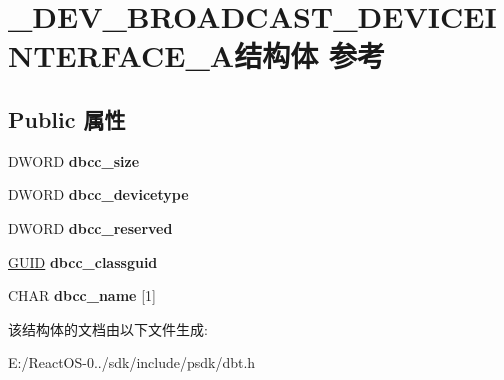 \hypertarget{struct___d_e_v___b_r_o_a_d_c_a_s_t___d_e_v_i_c_e_i_n_t_e_r_f_a_c_e___a}{}\section{\+\_\+\+D\+E\+V\+\_\+\+B\+R\+O\+A\+D\+C\+A\+S\+T\+\_\+\+D\+E\+V\+I\+C\+E\+I\+N\+T\+E\+R\+F\+A\+C\+E\+\_\+\+A结构体 参考}
\label{struct___d_e_v___b_r_o_a_d_c_a_s_t___d_e_v_i_c_e_i_n_t_e_r_f_a_c_e___a}
\subsection*{Public 属性}
\begin{DoxyCompactItemize}
\item 
\mbox{\label{struct___d_e_v___b_r_o_a_d_c_a_s_t___d_e_v_i_c_e_i_n_t_e_r_f_a_c_e___a_a7b77a09fecf998ec1914b75736b2065d}} 
D\+W\+O\+RD {\bfseries dbcc\+\_\+size}
\item 
\mbox{\label{struct___d_e_v___b_r_o_a_d_c_a_s_t___d_e_v_i_c_e_i_n_t_e_r_f_a_c_e___a_a2a36d15d8e3d90e80daea3074120f612}} 
D\+W\+O\+RD {\bfseries dbcc\+\_\+devicetype}
\item 
\mbox{\label{struct___d_e_v___b_r_o_a_d_c_a_s_t___d_e_v_i_c_e_i_n_t_e_r_f_a_c_e___a_a58ad39ce75f42929af62a372968576b1}} 
D\+W\+O\+RD {\bfseries dbcc\+\_\+reserved}
\item 
\mbox{\label{struct___d_e_v___b_r_o_a_d_c_a_s_t___d_e_v_i_c_e_i_n_t_e_r_f_a_c_e___a_a389903dc164d998f3c2c536c8ac72c85}} 
\hyperlink{interface_g_u_i_d}{G\+U\+ID} {\bfseries dbcc\+\_\+classguid}
\item 
\mbox{\label{struct___d_e_v___b_r_o_a_d_c_a_s_t___d_e_v_i_c_e_i_n_t_e_r_f_a_c_e___a_af43559114fae22202040072a4a7ed48f}} 
C\+H\+AR {\bfseries dbcc\+\_\+name} \mbox{[}1\mbox{]}
\end{DoxyCompactItemize}


该结构体的文档由以下文件生成\+:\begin{DoxyCompactItemize}
\item 
E\+:/\+React\+O\+S-\/0../sdk/include/psdk/dbt.\+h\end{DoxyCompactItemize}
